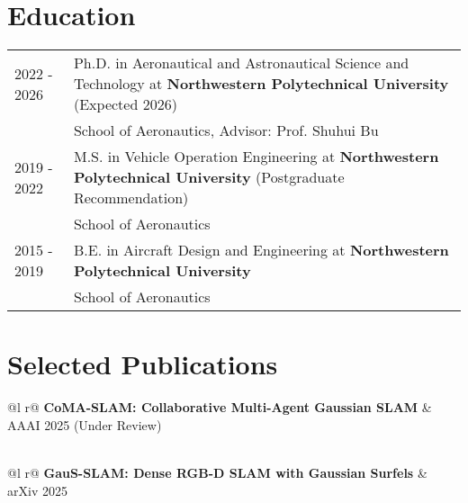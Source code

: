 \documentclass[a4paper,12pt]{article}
\begin{document}
\section{Education}
\begin{tabularx}{\linewidth}{@{}l X@{}}	
2022 - 2026 & Ph.D. in Aeronautical and Astronautical Science and Technology at \textbf{Northwestern Polytechnical University} \hfill \normalsize (Expected 2026) \\
& School of Aeronautics, Advisor: Prof. Shuhui Bu \\

2019 - 2022 & M.S. in Vehicle Operation Engineering at \textbf{Northwestern Polytechnical University} \hfill \normalsize (Postgraduate Recommendation) \\
& School of Aeronautics \\

2015 - 2019 & B.E. in Aircraft Design and Engineering at \textbf{Northwestern Polytechnical University} \\
& School of Aeronautics \\
\end{tabularx}

\section{Selected Publications}

\begin{tabularx}{\linewidth}{ @{}l r@{} }
\textbf{CoMA-SLAM: Collaborative Multi-Agent Gaussian SLAM} & \hfill AAAI 2025 (Under Review) \\
 \\
\end{tabularx}

\vspace{0.5em}

\begin{tabularx}{\linewidth}{ @{}l r@{} }
\textbf{GauS-SLAM: Dense RGB-D SLAM with Gaussian Surfels} & \hfill arXiv 2025 \\
 \\
\end{tabularx}
\end{document}
